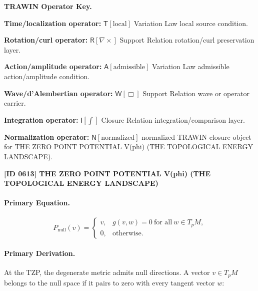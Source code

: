 \par\vspace{0.45\baselineskip}
\noindent\begin{minipage}[t]{\linewidth}
\begingroup
\small
\raggedright
\textbf{TRAWIN Operator Key.}\par
\noindent\textbf{Time/localization operator:} $\mathsf{T}\!\left[\mathrm{local}\right]$ Variation Law local source condition.\par
\noindent\textbf{Rotation/curl operator:} $\mathsf{R}\!\left[\nabla\times\right]$ Support Relation rotation/curl preservation layer.\par
\noindent\textbf{Action/amplitude operator:} $\mathsf{A}\!\left[\mathrm{admissible}\right]$ Variation Law admissible action/amplitude condition.\par
\noindent\textbf{Wave/d'Alembertian operator:} $\mathsf{W}\!\left[\Box\right]$ Support Relation wave or operator carrier.\par
\noindent\textbf{Integration operator:} $\mathsf{I}\!\left[\int\right]$ Closure Relation integration/comparison layer.\par
\noindent\textbf{Normalization operator:} $\mathsf{N}\!\left[\mathrm{normalized}\right]$ normalized TRAWIN closure object for THE ZERO POINT POTENTIAL V(phi) (THE TOPOLOGICAL ENERGY LANDSCAPE).\par
\endgroup
\end{minipage}

\clearpage
\noindent\textbf{[ID 0613] THE ZERO POINT POTENTIAL V(phi) (THE TOPOLOGICAL ENERGY LANDSCAPE)}\par
\vspace{0.35em}
\paragraph{Primary Equation.}
\begin{equation}
P_{\mathrm{null}}(v)
=
\begin{cases}
v, & g(v,w)=0\ \text{for all}\ w\in T_pM,\\
0, & \text{otherwise}.
\end{cases}
\end{equation}

\paragraph{Primary Derivation.}
At the TZP, the degenerate metric admits null directions.  
A vector $v\in T_pM$ belongs to the null space if it pairs to zero with every tangent vector $w$:

